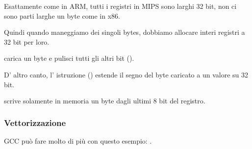 Esattamente come in ARM, tutti i registri in MIPS sono larghi 32 bit, non ci sono parti larghe un byte come in x86.

Quindi quando maneggiamo dei singoli bytes, dobbiamo allocare interi registri a 32 bit per loro.

 carica un byte e pulisci tutti gli altri bit ().

D' altro canto, l' istruzione  ()  estende il segno del byte caricato a un valore su 32 bit.

 scrive solamente in memoria un byte dagli ultimi 8 bit del registro.

\subsubsection{Vettorizzazione}

\Optimizing GCC può fare molto di più con questo esempio: .
